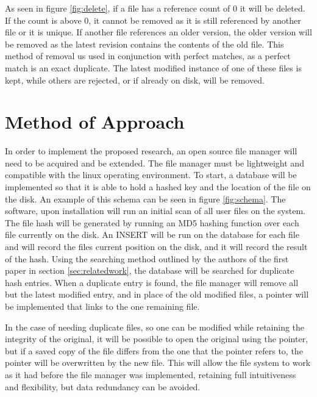 \documentclass[11pt]{article}
\begin{document}
As seen in figure \ref{fig:delete}, if a file has a reference count of 0 it will be deleted. If the count is above 0, it cannot be removed as it is still referenced by another file or it is unique. If another file references an older version, the older version will be removed as the latest revision contains the contents of the old file. This method of removal us used in conjunction with perfect matches, as a perfect match is an exact duplicate. The latest modified instance of one of these files is kept, while others are rejected, or if already on disk, will be removed. 

\vspace*{-.2in}
\section{Method of Approach}
\label{sec:method}
\vspace*{-.1in}

In order to implement the proposed research, an open source file manager will need to be acquired and be extended. The file manager must be lightweight and compatible with the linux operating environment. To start, a database will be implemented so that it is able to hold a hashed key and the location of the file on the disk. An example of this schema can be seen in figure \ref{fig:schema}. The software, upon installation will run an initial scan of all user files on the system. The file hash will be generated by running an MD5 hashing function over each file currently on the disk. An INSERT will be run on the database for each file and will record the files current position on the disk, and it will record the result of the hash. Using the searching method outlined by the authors of the first paper in section \ref{sec:relatedwork}, the database will be searched for duplicate hash entries. When a duplicate entry is found, the file manager will remove all but the latest modified entry, and in place of the old modified files, a pointer will be implemented that links to the one remaining file.

In the case of needing duplicate files, so one can be modified while retaining the integrity of the original, it will be possible to open the original using the pointer, but if a saved copy of the file differs from the one that the pointer refers to, the pointer will be overwritten by the new file. This will allow the file system to work as it had before the file manager was implemented, retaining full intuitiveness and flexibility, but data redundancy can be avoided.
\end{document}
